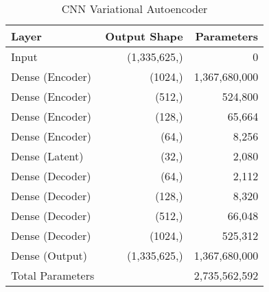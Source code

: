 \begin{table}[h]
    \centering
    \begin{tabular}{lrr}
        \toprule
        Layer & Output Shape & Parameters \\
        \midrule
        Input & (1,335,625,) & 0 \\
        Dense (Encoder) & (1024,) & 1,367,680,000 \\
        Dense (Encoder) & (512,) & 524,800 \\
        Dense (Encoder) & (128,) & 65,664 \\
        Dense (Encoder) & (64,) & 8,256 \\
        Dense (Latent) & (32,) & 2,080 \\
        Dense (Decoder) & (64,) & 2,112 \\
        Dense (Decoder) & (128,) & 8,320 \\
        Dense (Decoder) & (512,) & 66,048 \\
        Dense (Decoder) & (1024,) & 525,312 \\
        Dense (Output) & (1,335,625,) & 1,367,680,000 \\
        \midrule
        Total Parameters & & 2,735,562,592 \\
        \bottomrule
    \end{tabular}
    \caption{CNN Variational Autoencoder}
    \label{tab:a-cnnvae}
\end{table}